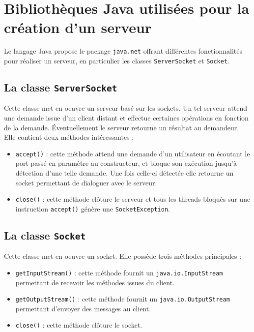 \documentclass[a4paper,11pt]{report}
\begin{document}
\section{Bibliothèques Java utilisées pour la création d\rq{}un serveur}

Le langage Java propose le package \texttt{java.net} offrant différentes fonctionnalités pour réaliser un serveur, en particulier les classes \texttt{ServerSocket} et \texttt{Socket}.

\subsection{La classe \texttt{ServerSocket}}
Cette classe met en oeuvre un serveur basé sur les sockets. Un tel serveur attend une demande issue d\rq{}un client distant et effectue certaines opérations en fonction de la demande. Éventuellement le serveur retourne un résultat au demandeur. Elle contient deux méthodes intéressantes :
\begin{itemize}
\item \texttt{accept()} : cette méthode attend une demande d\rq{}un utilisateur en écoutant le port passé en paramètre au constructeur, et bloque son exécution jusqu\rq{}à détection d\rq{}une telle demande. Une fois celle-ci détectée elle retourne un socket permettant de dialoguer avec le serveur.
\item \texttt{close()} : cette méthode clôture le serveur et tous les threads bloqués sur une instruction \texttt{accept()} génère une \texttt{SocketException}.
\end{itemize}

\newpage

\subsection{La classe \texttt{Socket}}
Cette classe met en oeuvre un socket. Elle possède trois méthodes principales :
\begin{itemize}
\item \texttt{getInputStream()} : cette méthode fournit un \texttt{java.io.InputStream} permettant de recevoir les méthodes issues du client.
\item \texttt{getOutputStream()} : cette méthode fournit un \texttt{java.io.OutputStream} permettant d\rq{}envoyer des messages au client.
\item \texttt{close()} : cette méthode clôture le socket.
\end{itemize}
\end{document}
